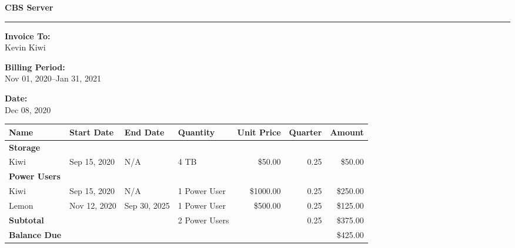 \documentclass{article}
\begin{document}
\hfill{\huge\bf CBS Server}\hfill
\bigskip
\hrule

{\bf Invoice To:} \\
Kevin Kiwi 

{\bf Billing Period:} \\
Nov 01, 2020--Jan 31, 2021

{\bf Date:} \\
Dec 08, 2020

\begin{table}[htb]
\begin{center}
\begin{tabular}[htb]{l l l l r r r}
\toprule
Name & Start Date & End Date & Quantity & Unit Price & Quarter & Amount\\
\midrule
\bf Storage & & & & & &\\
Kiwi & Sep 15, 2020 & N/A & 4 TB & \$50.00 & 0.25 & \$50.00\\
\bf Power Users\\

Kiwi & Sep 15, 2020 & N/A & 1 Power User & \$1000.00 & 0.25 & \$250.00\\

Lemon & Nov 12, 2020 & Sep 30, 2025 & 1 Power User & \$500.00 & 0.25 & \$125.00\\

\midrule
\bf Subtotal & & & 2 Power Users & & 0.25 & \$375.00\\
\bottomrule
\bf Balance Due & & & & & & \$425.00
\end{tabular}
\end{center}
\end{table}
\end{document}
